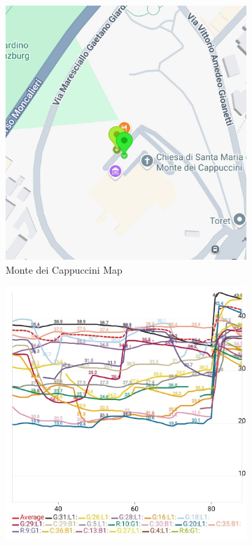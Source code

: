         \begin{figure}[htbp]
            \centering
            \begin{subfigure}{0.23\textwidth}
                \centering
                \includegraphics[width=\textwidth]{images/screenshots/Screenshot_20250503_GnssLogger_map.jpg}
                \caption{Monte dei Cappuccini Map}
                \label{fig:gnsslogger_map}
            \end{subfigure}
            \hfill
            \begin{subfigure}{0.23\textwidth}
                \centering
                \includegraphics[width=\textwidth]{images/screenshots/Screenshot_20250503_GnssLogger_plots.jpg}

\end{subfigure}
\end{figure}
